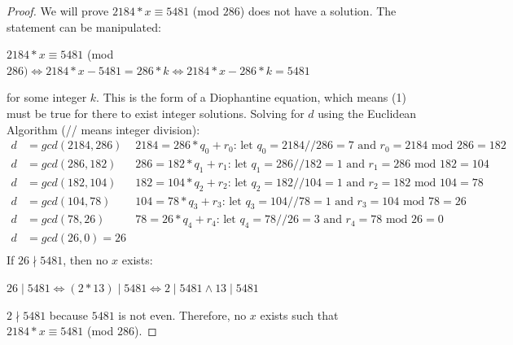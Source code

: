 \documentclass{article}
\begin{document}
\begin{proof}
	We will prove $2184*x \equiv 5481$ (mod $286$) does not have a solution. The statement can be manipulated:
	\begin{center}
		$2184*x \equiv 5481$ (mod $286) \iff 2184*x-5481=286*k \iff 2184*x-286*k=5481$
	\end{center}
	for some integer $k$. This is the form of a Diophantine equation, which means (1) must be true for there to exist integer solutions. 
	Solving for $d$ using the Euclidean Algorithm (// means integer division):
	\begin{align*}
		d &= gcd(2184,286) &2184=286*q_0+r_0 \text{: let $q_0=2184//286=7$ and $r_0=2184$ mod $286=182$} \\
		d &= gcd(286,182) &286=182*q_1+r_1 \text{: let $q_1=286//182=1$ and $r_1=286$ mod $182=104$} \\
		d &= gcd(182,104) &182=104*q_2+r_2 \text{: let $q_2=182//104=1$ and $r_2=182$ mod $104=78$} \\
		d &= gcd(104,78) &104=78*q_3+r_3 \text{: let $q_3=104//78=1$ and $r_3=104$ mod $78=26$} \\
		d &= gcd(78,26) &78=26*q_4+r_4 \text{: let $q_4=78//26=3$ and $r_4=78$ mod $26=0$} \\
		d &= gcd(26,0)=26 \\
	\end{align*}
	If $26 \nmid 5481$, then no $x$ exists:
	\begin{center}
		$26 \mid 5481 \iff (2*13) \mid 5481 \iff 2 \mid 5481 \land 13 \mid 5481$ 
	\end{center}
	$2 \nmid 5481$ because $5481$ is not even. Therefore, no $x$ exists such that $2184*x \equiv 5481$ (mod $286$).
\end{proof}

\clearpage
\header
\end{document}
